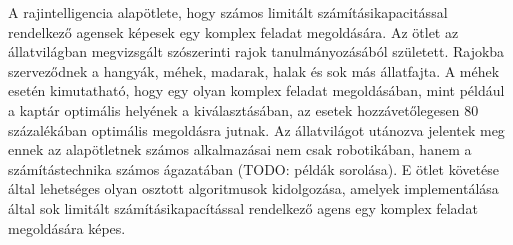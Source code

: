 A rajintelligencia alapötlete, hogy számos limitált számításikapacitással rendelkező agensek képesek egy komplex feladat megoldására.
Az ötlet az állatvilágban megvizsgált szószerinti rajok tanulmányozásából született. Rajokba szerveződnek a hangyák, méhek, madarak, halak és sok más állatfajta.
A méhek esetén kimutatható, hogy egy olyan komplex feladat megoldásában, mint például a kaptár optimális helyének a kiválasztásában, az esetek
hozzávetőlegesen 80 százalékában optimális megoldásra jutnak.
Az állatvilágot utánozva jelentek meg ennek az alapötletnek számos alkalmazásai nem csak robotikában, hanem a számítástechnika számos ágazatában (TODO: példák sorolása).
E ötlet követése által lehetséges olyan osztott algoritmusok kidolgozása, amelyek implementálása által sok limitált számításikapacítással rendelkező
agens egy komplex feladat megoldására képes.
